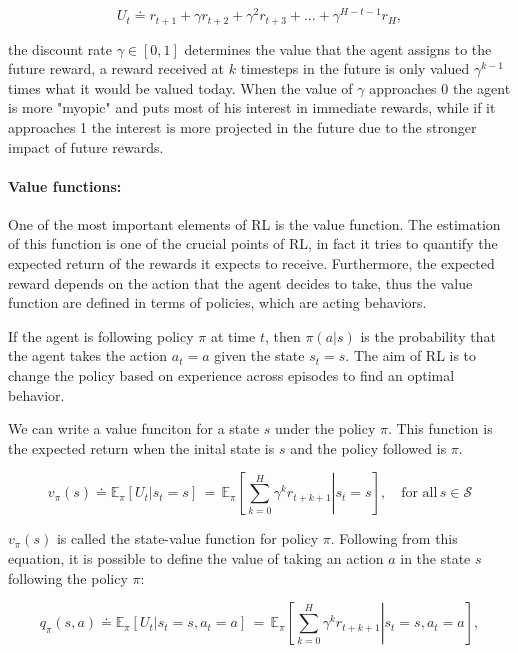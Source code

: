 \begin{equation}
U_t \doteq r_{t+1} + \gamma r_{t+2} + \gamma^2 r_{t+3} +... + \gamma^{H-t-1}r_{H},
\end{equation}

the discount rate \( \gamma \in [0,1] \) determines the value that the agent assigns to the future reward, a reward received at \( k \) timesteps in the future is only valued \(\gamma^{k-1} \) times what it would be valued today. When the value of \( \gamma \) approaches 0 the agent is more "myopic" and puts most of his interest in immediate rewards, while if it approaches 1 the interest is more projected in the future due to the stronger impact of future rewards.

\paragraph{Value functions: } One of the most important elements of RL is the value function. The estimation of this function is one of the crucial points of RL, in fact it tries to quantify the expected return of the rewards it expects to receive. Furthermore, the expected reward depends on the action that the agent decides to take, thus the value function are defined in terms of policies, which are acting behaviors.

If the agent is following policy \( \pi \) at time \( t \), then \( \pi(a|s) \) is the probability that the agent takes the action \( a_t = a \) given the state \( s_t = s \). The aim of RL is to change the policy based on experience across episodes to find an optimal behavior.

We can write a value funciton for a state \( s \) under the policy \( \pi \). This function is the expected return when the inital state is \( s \) and the policy followed is \( \pi \).

\begin{equation}
v_\pi(s) \doteq \mathbb{E} _\pi \left[ U_t | s_t = s \right] \, =\,  \mathbb{E} _\pi \left[\left.\sum_{k = 0}^{H}\gamma^k r_{t+k+1}  \right| s_t = s \right], \quad \text{for all}\, s \in \mathcal{S} 
\label{eq:statevalue_function}
\end{equation}

\(  v_\pi(s)\) is called the state-value function for policy \( \pi \). Following from this equation, it is possible to define the value of taking an action \( a \) in the state \( s \) following the policy \( \pi \):

\begin{equation}
    q_\pi(s,a) \doteq \mathbb{E} _\pi \left[ U_t | s_t = s, a_t = a \right] \, =\,  \mathbb{E} _\pi \left[\left.\sum_{k = 0}^{H}\gamma^k r_{t+k+1}  \right| s_t = s, a_t = a \right],
    \label{eq:actionvalue_function}
\end{equation}
    
